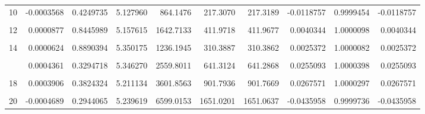 \documentclass[a4paper]{tufte-handout}
\begin{document}
\begin{table}
{\begin{tabular}[t]{rrrrrrrrrr}
10 & -0.0003568 & 0.4249735 & 5.127960 & 864.1476 & 217.3070 & 217.3189 & -0.0118757 & 0.9999454 & -0.0118757\\
\addlinespace
\cellcolor{gray!6}{11} & \cellcolor{gray!6}{-0.0001285} & \cellcolor{gray!6}{0.7738059} & \cellcolor{gray!6}{5.161446} & \cellcolor{gray!6}{3846.1338} & \cellcolor{gray!6}{962.8147} & \cellcolor{gray!6}{962.8238} & \cellcolor{gray!6}{-0.0090546} & \cellcolor{gray!6}{0.9999906} & \cellcolor{gray!6}{-0.0090546}\\
12 & 0.0000877 & 0.8445989 & 5.157615 & 1642.7133 & 411.9718 & 411.9677 & 0.0040344 & 1.0000098 & 0.0040344\\
\cellcolor{gray!6}{13} & \cellcolor{gray!6}{-0.0002277} & \cellcolor{gray!6}{0.6106733} & \cellcolor{gray!6}{5.171313} & \cellcolor{gray!6}{221321.9773} & \cellcolor{gray!6}{55331.6654} & \cellcolor{gray!6}{55331.7872} & \cellcolor{gray!6}{-0.1217900} & \cellcolor{gray!6}{0.9999978} & \cellcolor{gray!6}{-0.1217900}\\
14 & 0.0000624 & 0.8890394 & 5.350175 & 1236.1945 & 310.3887 & 310.3862 & 0.0025372 & 1.0000082 & 0.0025372\\
\cellcolor{gray!6}{15} & \cellcolor{gray!6}{0.0001417} & \cellcolor{gray!6}{0.7512863} & \cellcolor{gray!6}{5.163609} & \cellcolor{gray!6}{2524.0812} & \cellcolor{gray!6}{632.3193} & \cellcolor{gray!6}{632.3112} & \cellcolor{gray!6}{0.0080909} & \cellcolor{gray!6}{1.0000128} & \cellcolor{gray!6}{0.0080909}\\
\addlinespace
16 & 0.0004361 & 0.3294718 & 5.346270 & 2559.8011 & 641.3124 & 641.2868 & 0.0255093 & 1.0000398 & 0.0255093\\
\cellcolor{gray!6}{17} & \cellcolor{gray!6}{0.0001128} & \cellcolor{gray!6}{0.8009107} & \cellcolor{gray!6}{5.272119} & \cellcolor{gray!6}{12234.8436} & \cellcolor{gray!6}{3060.0432} & \cellcolor{gray!6}{3060.0289} & \cellcolor{gray!6}{0.0143208} & \cellcolor{gray!6}{1.0000047} & \cellcolor{gray!6}{0.0143208}\\
18 & 0.0003906 & 0.3824324 & 5.211134 & 3601.8563 & 901.7936 & 901.7669 & 0.0267571 & 1.0000297 & 0.0267571\\
\cellcolor{gray!6}{19} & \cellcolor{gray!6}{-0.0002745} & \cellcolor{gray!6}{0.5393874} & \cellcolor{gray!6}{5.508024} & \cellcolor{gray!6}{1170.0237} & \cellcolor{gray!6}{293.8719} & \cellcolor{gray!6}{293.8829} & \cellcolor{gray!6}{-0.0110170} & \cellcolor{gray!6}{0.9999625} & \cellcolor{gray!6}{-0.0110170}\\
20 & -0.0004689 & 0.2944065 & 5.239619 & 6599.0153 & 1651.0201 & 1651.0637 & -0.0435958 & 0.9999736 & -0.0435958\\
\bottomrule
\end{tabular}}
\end{table}


\end{document}
